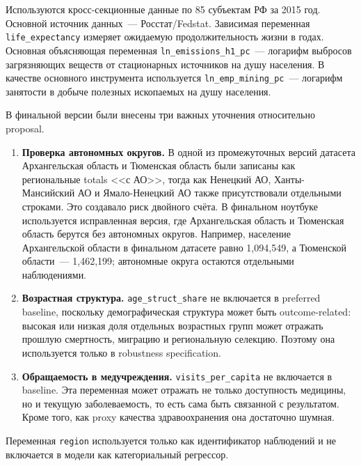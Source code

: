 \documentclass[11pt,a4paper]{article}
\begin{document}
Используются кросс-секционные данные по 85 субъектам РФ за 2015 год. Основной источник данных~--- Росстат/Fedstat. Зависимая переменная \texttt{life\_expectancy} измеряет ожидаемую продолжительность жизни в годах. Основная объясняющая переменная \texttt{ln\_emissions\_h1\_pc}~--- логарифм выбросов загрязняющих веществ от стационарных источников на душу населения. В качестве основного инструмента используется \texttt{ln\_emp\_mining\_pc}~--- логарифм занятости в добыче полезных ископаемых на душу населения.

В финальной версии были внесены три важных уточнения относительно proposal.

\begin{enumerate}
  \item \textbf{Проверка автономных округов.} В одной из промежуточных версий датасета Архангельская область и Тюменская область были записаны как региональные totals <<с АО>>, тогда как Ненецкий АО, Ханты-Мансийский АО и Ямало-Ненецкий АО также присутствовали отдельными строками. Это создавало риск двойного счёта. В финальном ноутбуке используется исправленная версия, где Архангельская область и Тюменская область берутся без автономных округов. Например, население Архангельской области в финальном датасете равно 1{,}094{,}549, а Тюменской области~--- 1{,}462{,}199; автономные округа остаются отдельными наблюдениями.
  \item \textbf{Возрастная структура.} \texttt{age\_struct\_share} не включается в preferred baseline, поскольку демографическая структура может быть outcome-related: высокая или низкая доля отдельных возрастных групп может отражать прошлую смертность, миграцию и региональную селекцию. Поэтому она используется только в robustness specification.
  \item \textbf{Обращаемость в медучреждения.} \texttt{visits\_per\_capita} не включается в baseline. Эта переменная может отражать не только доступность медицины, но и текущую заболеваемость, то есть сама быть связанной с результатом. Кроме того, как proxy качества здравоохранения она достаточно шумная.
\end{enumerate}

Переменная \texttt{region} используется только как идентификатор наблюдений и не включается в модели как категориальный регрессор.
\end{document}
